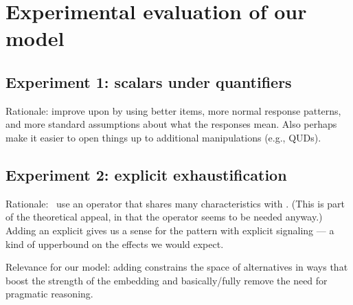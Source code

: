 \documentclass{article}
\begin{document}
\begin{examples}
\begin{examples}
  \end{examples}
\end{examples}



\section{Experimental evaluation of our model}\label{sec:experiments}


\subsection{Experiment 1: scalars under quantifiers}\label{sec:exp1}

\begin{examples}
\item Rationale: improve upon \citet{Chemla:Spector:2011} by using
  better items, more normal response patterns, and more standard
  assumptions about what the responses mean. Also perhaps make it
  easier to open things up to additional manipulations (e.g., QUDs).
\end{examples}


\subsection{Experiment 2: explicit exhaustification}\label{sec:exp2}

\begin{examples}
\item Rationale: \CFS\ use an operator that shares many
  characteristics with . (This is part of the theoretical
  appeal, in that the operator seems to be needed anyway.)  Adding an
  explicit  gives us a sense for the pattern with explicit
  signaling --- a kind of upperbound on the effects we would expect.

\item Relevance for our model: adding  constrains the space
  of alternatives in ways that boost the strength of the embedding and
  basically/fully remove the need for pragmatic reasoning.  
\end{examples}

\end{document}
